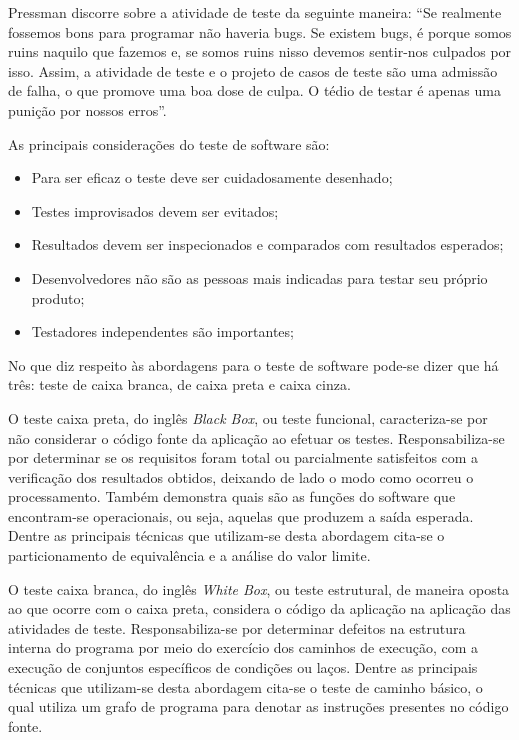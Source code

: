Pressman discorre sobre a atividade de teste da seguinte maneira: “Se
 realmente fossemos bons para programar não haveria bugs. Se existem bugs, é
 porque somos ruins naquilo que fazemos e, se somos ruins nisso devemos
 sentir-nos culpados por isso. Assim, a atividade de teste e o projeto de
 casos de teste são 
uma admissão de falha, o que promove uma boa dose de culpa. O tédio de
 testar é apenas uma punição por nossos erros”. 

As principais considerações do teste de software são: 

\begin{itemize}
\item Para ser eficaz o teste deve ser cuidadosamente desenhado;
\item Testes improvisados devem ser evitados;
\item Resultados devem ser inspecionados e comparados com resultados esperados;
\item Desenvolvedores não são as pessoas mais indicadas para testar seu próprio produto;
\item Testadores independentes são importantes;
\end{itemize}

No que diz respeito às abordagens para o teste de software pode-se dizer que
 há três: teste de caixa branca, de caixa preta e caixa cinza.

O teste caixa preta, do inglês \textit{Black Box}, ou teste funcional,
 caracteriza-se por não considerar o código fonte da aplicação ao efetuar os
 testes. Responsabiliza-se por determinar se os requisitos foram total ou
 parcialmente satisfeitos com a verificação dos resultados obtidos, deixando
 de lado o modo como ocorreu o processamento. Também demonstra quais são as
 funções do software que encontram-se operacionais, ou seja, aquelas que
 produzem a saída esperada. Dentre as principais técnicas que utilizam-se
 desta abordagem cita-se o particionamento de equivalência e a análise do
 valor limite.

O teste caixa branca, do inglês \textit{White Box}, ou teste estrutural, de
 maneira oposta ao que ocorre com o caixa preta, considera o código da
 aplicação na aplicação das atividades de teste. Responsabiliza-se por
 determinar defeitos na estrutura interna do programa por meio do exercício
 dos caminhos de execução, com a execução de conjuntos específicos de
 condições ou laços. Dentre as principais técnicas
 que utilizam-se desta abordagem cita-se o teste de caminho básico, o qual
 utiliza um grafo de programa para denotar as instruções presentes no código
 fonte.

